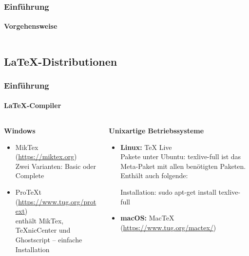 \begin{frame}
\frametitle{Einführung}
\framesubtitle{Vorgehensweise}
\begin{columns}[onlytextwidth]
\begin{column}{0.40\textwidth}
\end{column}
\begin{column}{0.25\textwidth}
\end{column}
\begin{column}{0.25\textwidth}
\end{column}
\end{columns}
\end{frame}




\subsection{\LaTeX-Distributionen}
\begin{frame}
\frametitle{Einführung}
\framesubtitle{\LaTeX-Compiler}
\begin{columns}[t]
\begin{column}{.4\textwidth}
\textbf{Windows}\\
\begin{itemize}
  \item MikTex (\url{https://miktex.org})\\
   Zwei Varianten: Basic oder Complete
  \item ProTeXt (\url{https://www.tug.org/protext})\\
   enthält MikTex, TeXnicCenter und Ghostscript – einfache Installation\\
\end{itemize}
\end{column}
\begin{column}{.6\textwidth}
\textbf{Unixartige Betriebssysteme}
\begin{itemize}
  \item \textbf{Linux:} TeX Live\\
Pakete unter Ubuntu: {\ttfamily texlive-full} ist das Meta-Paket mit allen
ben\"otigten Paketen. Enthält auch folgende:
Installation: {\ttfamily sudo apt-get install texlive-full}
\item \textbf{macOS:} MacTeX (\url{https://www.tug.org/mactex/})\\
\end{itemize}
\end{column}
\end{columns}
\end{frame}

